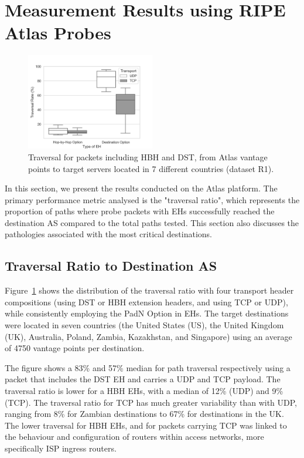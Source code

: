 \documentclass[conference]{IEEEtran}
\begin{document}
\section{Measurement Results using RIPE Atlas Probes} 
\label{sec:ripe-results}

\begin{figure}[t]
\centering
  \includegraphics[width=0.5\textwidth]{all_traversal.png}
  \caption{Traversal for packets including HBH and DST, from Atlas vantage points to target servers located in 7 different countries (dataset R1).}
  \label{fig:countrybox}
\end{figure}

In this section, we present the results conducted on the Atlas platform. 
The primary performance metric analysed is the "traversal ratio",
which represents the proportion of paths where probe packets with EHs
successfully reached the destination AS compared to the total paths tested.
This section also discusses the pathologies associated with the most
critical destinations.

\subsection{Traversal Ratio to Destination AS}


Figure~\ref{fig:countrybox} shows the distribution of the traversal ratio with
four transport header compositions (using DST or HBH extension headers, and
using TCP or UDP), while consistently employing the PadN Option in EHs.  The target
destinations were located in seven countries (the United States (US), the
United Kingdom (UK), Australia, Poland, Zambia, Kazakhstan, and Singapore) using
an average of 4750 vantage points per destination.

The figure shows a 83\% and 57\% median for path traversal 
respectively using a packet that includes the
DST EH and carries a UDP and TCP payload.  The traversal ratio is lower
for a HBH EHs, with a median of 12\% (UDP) and 9\% (TCP). The traversal ratio
 for TCP has much greater variability than with
UDP, ranging from 8\% for Zambian destinations to 67\% for destinations in the
UK. The lower traversal for HBH EHs, and for packets carrying TCP
was  linked to the
behaviour and configuration of routers within access networks, more
specifically ISP ingress routers.
\end{document}
